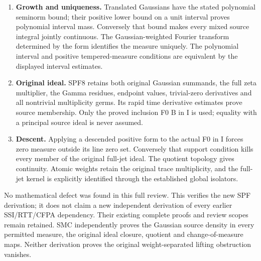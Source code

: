 \begin{enumerate}
  has exactly equal Gram matrices. Finite-measure Fourier uniqueness
  gives dense range. Multiplication by exp(-lambda squared) transports
  L2(nu) isometrically onto L2(exp(2 lambda squared)nu), with the
  specified inverse and domains. The original source vector then maps to
  its actual line values. This proves the entire receiver is
  represented, including possible continuous measure.
\item
  \textbf{Growth and uniqueness.} Translated Gaussians have the stated
  polynomial seminorm bound; their positive lower bound on a unit
  interval proves polynomial interval mass. Conversely that bound makes
  every mixed source integral jointly continuous. The Gaussian-weighted
  Fourier transform determined by the form identifies the measure
  uniquely. The polynomial interval and positive tempered-measure
  conditions are equivalent by the displayed interval estimates.
\item
  \textbf{Original ideal.} SPF8 retains both original Gaussian summands,
  the full zeta multiplier, the Gamma residues, endpoint values,
  trivial-zero derivatives and all nontrivial multiplicity germs. Its
  rapid time derivative estimates prove source membership. Only the
  proved inclusion F0 B in I is used; equality with a principal source
  ideal is never assumed.
\item
  \textbf{Descent.} Applying a descended positive form to the actual F0
  in I forces zero measure outside its line zero set. Conversely that
  support condition kills every member of the original full-jet ideal.
  The quotient topology gives continuity. Atomic weights retain the
  original trace multiplicity, and the full-jet kernel is explicitly
  identified through the established global isolators.
\end{enumerate}

No mathematical defect was found in this full review. This verifies the
new SPF derivation; it does not claim a new independent derivation of
every earlier SSI/RTT/CFPA dependency. Their existing complete proofs
and review scopes remain retained. SMC independently proves the Gaussian
source density in every permitted measure, the original ideal closure,
quotient and change-of-measure maps. Neither derivation proves the
original weight-separated lifting obstruction vanishes.
